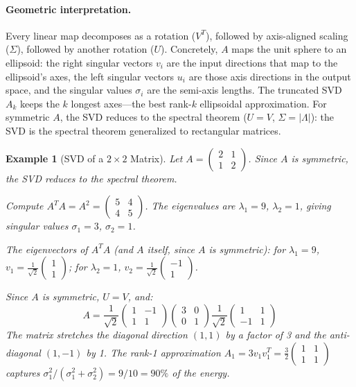 \documentclass[12pt,a4paper]{report}
\theoremstyle{thms}
\theoremstyle{defns}
\newtheorem{example}{Example}[section]
\begin{document}
\paragraph{Geometric interpretation.} Every linear map decomposes as a rotation ($V^T$), followed by axis-aligned scaling ($\Sigma$), followed by another rotation ($U$). Concretely, $A$ maps the unit sphere to an ellipsoid: the right singular vectors $v_i$ are the input directions that map to the ellipsoid's axes, the left singular vectors $u_i$ are those axis directions in the output space, and the singular values $\sigma_i$ are the semi-axis lengths. The truncated SVD $A_k$ keeps the $k$ longest axes—the best rank-$k$ ellipsoidal approximation. For symmetric $A$, the SVD reduces to the spectral theorem ($U = V$, $\Sigma = |\Lambda|$): the SVD is the spectral theorem generalized to rectangular matrices.

\begin{example}[SVD of a $2 \times 2$ Matrix]
    Let $A = \begin{pmatrix} 2 & 1 \\ 1 & 2 \end{pmatrix}$. Since $A$ is symmetric, the SVD reduces to the spectral theorem.

    Compute $A^TA = A^2 = \begin{pmatrix} 5 & 4 \\ 4 & 5 \end{pmatrix}$. The eigenvalues are $\lambda_1 = 9$, $\lambda_2 = 1$, giving singular values $\sigma_1 = 3$, $\sigma_2 = 1$.

    The eigenvectors of $A^TA$ (and $A$ itself, since $A$ is symmetric): for $\lambda_1 = 9$, $v_1 = \frac{1}{\sqrt{2}}\begin{pmatrix} 1 \\ 1 \end{pmatrix}$; for $\lambda_2 = 1$, $v_2 = \frac{1}{\sqrt{2}}\begin{pmatrix} -1 \\ 1 \end{pmatrix}$.

    Since $A$ is symmetric, $U = V$, and:
    \begin{equation}
        A = \dfrac{1}{\sqrt{2}}\begin{pmatrix} 1 & -1 \\ 1 & 1 \end{pmatrix} \begin{pmatrix} 3 & 0 \\ 0 & 1 \end{pmatrix} \dfrac{1}{\sqrt{2}}\begin{pmatrix} 1 & 1 \\ -1 & 1 \end{pmatrix}
    \end{equation}
    The matrix stretches the diagonal direction $(1,1)$ by a factor of 3 and the anti-diagonal $(1,-1)$ by 1. The rank-1 approximation $A_1 = 3 v_1 v_1^T = \frac{3}{2}\begin{pmatrix} 1 & 1 \\ 1 & 1 \end{pmatrix}$ captures $\sigma_1^2/(\sigma_1^2 + \sigma_2^2) = 9/10 = 90\%$ of the energy.
\end{example}
\end{document}
